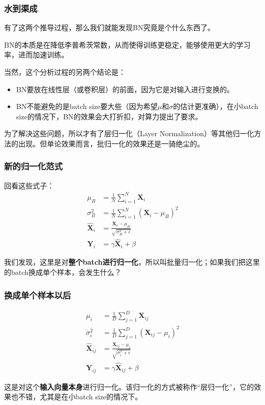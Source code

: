 \documentclass{ctexbeamer}
\begin{document}
\begin{frame}
    \frametitle{水到渠成}

    有了这两个推导过程，那么我们就能发现BN究竟是个什么东西了。

    BN的本质是在降低李普希茨常数，从而使得训练更稳定，能够使用更大的学习率，进而加速训练。

    当然，这个分析过程的另两个结论是：
    \begin{itemize}
        \item BN要放在线性层（或卷积层）的前面，因为它是对输入进行变换的。
        \item BN不能避免的是batch size要大些（因为希望$\mu$和$\sigma$的估计更准确），在小batch size的情况下，BN的效果会大打折扣，对算力提出了要求。
    \end{itemize}
    为了解决这些问题，所以才有了层归一化（Layer Normalization）等其他归一化方法的出现。但单论效果而言，批归一化的效果还是一骑绝尘的。
\end{frame}

\begin{frame}
    \frametitle{新的归一化范式}

    回看这些式子：
\begin{align}
\mu_B &= \frac{1}{N} \sum_{i=1}^{N} \mathbf{X}_i \\
\sigma_B^2 &= \frac{1}{N} \sum_{i=1}^{N} (\mathbf{X}_i - \mu_B)^2 \\
\hat{\mathbf{X}}_i &= \frac{\mathbf{X}_i - \mu_B}{\sqrt{\sigma_B^2 + \epsilon}} \\
\mathbf{Y}_i &= \gamma \hat{\mathbf{X}}_i + \beta
\end{align}

    我们发现，这里是对\textbf{整个batch进行归一化}，所以叫批量归一化；如果我们把这里的batch换成单个样本，会发生什么？

\end{frame}

\begin{frame}
    \frametitle{换成单个样本以后}

\begin{align}
\mu_i &= \frac{1}{D} \sum_{j=1}^{D} \mathbf{X}_{ij} \\
\sigma_i^2 &= \frac{1}{D} \sum_{j=1}^{D} (\mathbf{X}_{ij} - \mu_i)^2 \\
\hat{\mathbf{X}}_{ij} &= \frac{\mathbf{X}_{ij} - \mu_i}{\sqrt{\sigma_i^2 + \epsilon}} \\
\mathbf{Y}_{ij} &= \gamma \hat{\mathbf{X}}_{ij} + \beta
\end{align}

这是对这个\textbf{输入向量本身}进行归一化。该归一化的方式被称作“层归一化”，它的效果也不错，尤其是在小batch size的情况下。

\end{frame}
\end{document}
